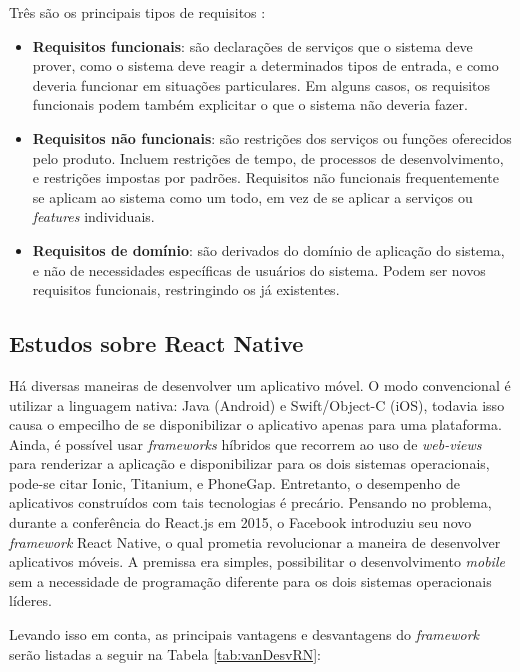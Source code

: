 Três são os principais tipos de requisitos \citep{Sommervile2010}:
\begin{itemize}
    \item \textbf{Requisitos funcionais}: são declarações de serviços que o sistema deve prover, como o sistema deve reagir a determinados tipos de entrada, e como deveria funcionar em situações particulares. Em alguns casos, os requisitos funcionais podem também explicitar o que o sistema não deveria fazer.
    
    \item \textbf{Requisitos não funcionais}: são restrições dos serviços ou funções oferecidos pelo produto. Incluem restrições de tempo, de processos de desenvolvimento, e restrições impostas por padrões. Requisitos não funcionais frequentemente se aplicam ao sistema como um todo, em vez de se aplicar a serviços ou \textit{features} individuais.
    
    \item \textbf{Requisitos de domínio}: são derivados do domínio de aplicação do sistema, e não de necessidades específicas de usuários do sistema. Podem ser novos requisitos funcionais, restringindo os já existentes. 
\end{itemize}


\subsection{Estudos sobre React Native} 
Há diversas maneiras de desenvolver um aplicativo móvel. O modo convencional é utilizar a linguagem nativa: Java (Android) e Swift/Object-C (iOS), todavia isso causa o empecilho de se disponibilizar o aplicativo apenas para uma plataforma. Ainda, é possível usar \textit{frameworks} híbridos que recorrem ao uso de \textit{web-views} para renderizar a aplicação e disponibilizar para os dois sistemas operacionais, pode-se citar Ionic, Titanium, e PhoneGap. Entretanto, o desempenho de aplicativos construídos com tais tecnologias é precário. Pensando no problema, durante a conferência do React.js em 2015, o Facebook introduziu seu novo \textit{framework} React Native, o qual prometia revolucionar a maneira de desenvolver aplicativos móveis. A premissa era simples, possibilitar o desenvolvimento \textit{mobile} sem a necessidade de programação diferente para os dois sistemas operacionais líderes.

Levando isso em conta, as principais vantagens e desvantagens do \textit{framework} serão listadas a seguir na Tabela \ref{tab:vanDesvRN}:

